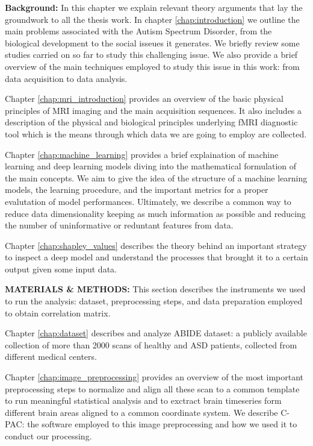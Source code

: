 \documentclass[11pt]{report}
\begin{document}
\textbf{Background:} In this chapter we explain relevant theory arguments that lay the groundwork to all the thesis work.
In chapter \ref{chap:introduction} we outline the main problems associated with the Autism Spectrum Disorder, from the biological development to the social isseues it generates. We briefly review some studies carried on so far to study this challenging issue. We also provide a brief overview of the main techniques employed to study this issue in this work: from data acquisition to data analysis.

Chapter \ref{chap:mri_introduction} provides an overview of the basic physical principles of MRI imaging and the main acquisition sequences. It also includes a description of the physical and biological principles underlying fMRI diagnostic tool which is the means through which data we are going to employ are collected.

Chapter \ref{chap:machine_learning} provides a brief explaination of machine learning and deep learning models diving into the mathematical formulation of the main concepts. We aim to give the idea of the structure of a machine learning models, the learning procedure, and the important metrics for a proper evalutation of model performances.
Ultimately, we describe a common way to reduce data dimensionality keeping as much information as possible and reducing the number of uninformative or reduntant features from data.

Chapter \ref{chap:shapley_values} describes the theory behind an important strategy to inspect a deep model  and understand the processes that brought it to a certain output given some input data.

\textbf{MATERIALS \& METHODS:} This section describes the instruments we used to run the analysis: dataset, preprocessing steps, and data preparation employed to obtain correlation matrix.

Chapter \ref{chap:dataset} describes and analyze ABIDE dataset: a publicly available collection of more than 2000 scans of healthy and ASD patients, collected from different medical centers.

Chapter \ref{chap:image_preprocessing} provides an overview of the most important preprocessing steps to normalize and align all these scan to a common template to run meaningful statistical analysis and to exctract brain timeseries form different brain areas aligned to a common coordinate system. We describe C-PAC: the software employed to this image preprocessing and how we used it to conduct our processing.
\end{document}
